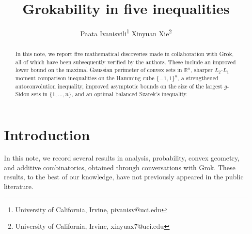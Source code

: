 \documentclass[11pt]{article}
\title{Grokability in five inequalities}
\author{
Paata Ivanisvili\thanks{University of California, Irvine, pivanisv@uci.edu} \quad  Xinyuan Xie\thanks{University of California, Irvine, xinyuax7@uci.edu} }
\date{}
\begin{document}
\maketitle

\begin{abstract}
In this note, we report five mathematical discoveries made in collaboration with Grok, all of which have been subsequently verified by the authors. These include an improved lower bound on the maximal Gaussian perimeter of convex sets in $\mathbb{R}^n$, sharper $L_2$-$L_1$ moment comparison inequalities on the Hamming cube $\{-1,1\}^n$, a strengthened autoconvolution inequality, improved asymptotic bounds on the size of the largest $g$-Sidon sets in $\{1,\dots,n\}$, and an optimal balanced Szarek's inequality.
\end{abstract}


\section{Introduction}
In this note, we record several results in analysis, probability, convex geometry, and additive combinatorics, obtained through conversations with Grok. These results, to the best of our knowledge, have not previously appeared in the public literature. 
\end{document}
